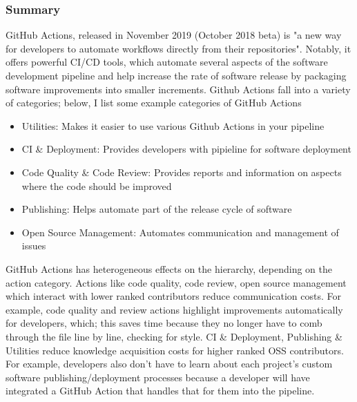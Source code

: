 \documentclass[source/paper/main.tex]{subfiles}
\begin{document}
\subsubsection{Summary}
GitHub Actions, released in November 2019 (October 2018 beta) is "a new way for developers to automate workflows directly from their repositories". Notably, it offers powerful CI/CD tools, which automate several aspects of the software development pipeline and help increase the rate of software release by packaging software improvements into smaller increments. Github Actions fall into a variety of categories; below, I list some example categories of GitHub Actions
\begin{itemize}
    \item Utilities: Makes it easier to use various Github Actions in your pipeline
    \item CI \& Deployment: Provides developers with pipieline for software deployment 
    \item Code Quality \& Code Review: Provides reports and information on aspects where the code should be improved
    \item Publishing: Helps automate part of the release cycle of software
    \item Open Source Management: Automates communication and management of issues
\end{itemize}
GitHub Actions has heterogeneous effects on the hierarchy, depending on the action category. Actions like code quality, code review, open source management which interact with lower ranked contributors reduce communication costs. 
For example, code quality and review actions highlight improvements automatically for developers, which; this saves time because they no longer have to comb through the file line by line, checking for style. CI \& Deployment, Publishing \& Utilities reduce knowledge acquisition costs for higher ranked OSS contributors. For example, developers also don't have to learn about each project's custom software publishing/deployment processes because a developer will have integrated a GitHub Action that handles that for them into the pipeline. 
\end{document}
